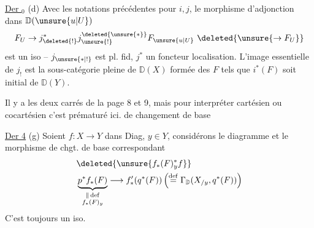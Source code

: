 \uline{Der }$_0$ (d) Avec les notations précédentes pour $i,j$, le morphisme d'adjonction dans $\mathbb D(\unsure{u|U})$
\[
 F_U\to j_{\deleted{!}}^*j_{\unsure{!}}^{\deleted{\unsure{*}}}F_{\unsure{u|U}}\ \deleted{\unsure{\to F_U}}
\]
est un iso -- $j_{\unsure{*|!}}$ est pl. fid, $j^*$ un foncteur localisation. L'image essentielle de $j_!$ est la sous-catégorie pleine de $\mathbb D(X)$ formée des $F$  tels que $i^*(F)$ soit  initial  de $\mathbb D(Y)$.

Il y a les deux carrés de la page 8 et 9, mais pour interpréter   cartésien ou cocartésien c'est prématuré ici.
 de changement de base

\uline{Der 4} (g) Soient $f:X\to Y$ dans Diag, $y\in Y$, considérons le diagramme 
et le morphisme de chgt. de base correspondant
\[
 \begin{aligned}
 &\deleted{\unsure{f_*(F)_y^*f}}\\
 &\underbrace{p^*f_*(F)}_{\substack{\parallel\,\mathrm{def}\\ f_*(F)_y}}\longrightarrow
 f'_* (q^*(F))\left(\overset{\mathrm{def}}{=}\Gamma_{\mathbb D}(X_{/y},q^*(F))\right)
 \end{aligned}
\]
C'est toujours un iso.

